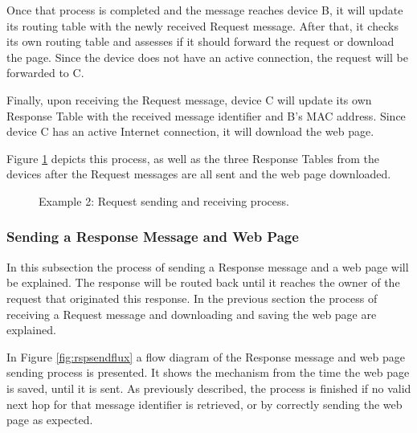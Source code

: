 Once that process is completed and the message reaches device B, it will update its routing table with the newly received Request message. After that, it checks its own routing table and assesses if it should forward the request or download the page. Since the device does not have an active connection, the request will be forwarded to C.

Finally, upon receiving the Request message, device C will update its own Response Table with the received message identifier and B's \gls{MAC} address. Since device C has an active Internet connection, it will download the web page.

Figure \ref{fig:example1.1} depicts this process, as well as the three Response Tables from the devices after the Request messages are all sent and the web page downloaded.

\begin{figure}[ht]
	\noindent{}
	\caption{\label{fig:example1.1} Example 2: Request sending and receiving process.}
\end{figure}

\subsubsection{Sending a Response Message and Web Page}
\label{subsubsec:sendrsp}

In this subsection the process of sending a Response message and a web page will be explained. The response will be routed back until it reaches the owner of the request that originated this response. In the previous section the process of receiving a Request message and downloading and saving the web page are explained.

In Figure \ref{fig:rspsendflux} a flow diagram of the Response message and web page sending process is presented. It shows the mechanism from the time the web page is saved, until it is sent. As previously described, the process is finished if no valid next hop for that message identifier is retrieved, or by correctly sending the web page as expected.

